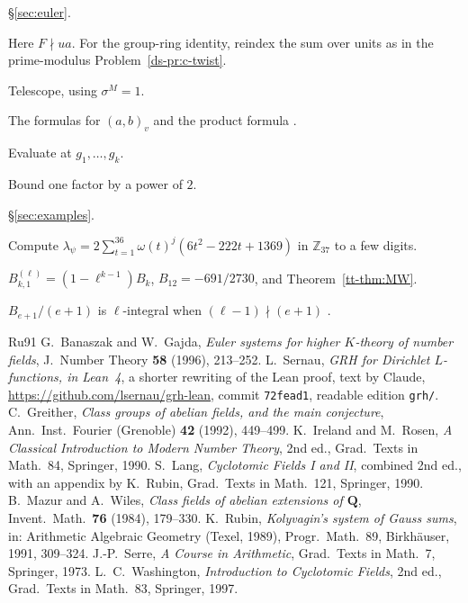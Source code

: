 \documentclass[reqno]{amsart}
\theoremstyle{definition}
\theoremstyle{plain}
\newcommand{\Z}{\mathbb{Z}}
\begin{document}
{\noindent\S\ref{sec:euler}.
\begin{description}\setlength{\itemsep}{0pt}
\item[\ref{pr:theta}] Here \(F\nmid ua\).  For the group-ring identity, reindex the sum over units as in the prime-modulus Problem~\ref{ds-pr:c-twist}.
\item[\ref{pr:derivative}] Telescope, using \(\sigma^M=1\).
\item[\ref{pr:hilbert}] The formulas for \((a,b)_v\) and the product formula \cite[Ch.~III, \S2]{Se}.
\item[\ref{pr:exponent-rank}] Evaluate at \(g_1,\dots,g_k\).
\item[\ref{pr:sum-e}] Bound one factor by a power of \(2\).
\end{description}

\noindent\S\ref{sec:examples}.
\begin{description}\setlength{\itemsep}{0pt}
\item[\ref{pr:37}] Compute \(\lambda_\psi=2\sum_{t=1}^{36}\omega(t)^j(6t^2-222t+1369)\) in \(\Z_{37}\) to a few digits.
\item[\ref{pr:psi-one}] \(B^{(\ell)}_{k,1}=(1-\ell^{k-1})B_k\), \(B_{12}=-691/2730\), and Theorem~\ref{tt-thm:MW}.
\item[\ref{pr:compare}] \(B_{e+1}/(e+1)\) is \(\ell\)-integral when \((\ell-1)\nmid(e+1)\) \cite[Cor.~5.14]{Wa}.
\end{description}

}

{\small
\begin{thebibliography}{Ru91}
 G.~Banaszak and W.~Gajda, \emph{Euler systems for higher \(K\)-theory of number fields}, J.\ Number Theory \textbf{58} (1996), 213--252.
 L.~Sernau, \emph{GRH for Dirichlet \(L\)-functions, in Lean~4}, a shorter rewriting of the Lean proof, text by Claude, \url{https://github.com/lsernau/grh-lean}, commit \texttt{72fead1}, readable edition \texttt{grh/}.
 C.~Greither, \emph{Class groups of abelian fields, and the main conjecture}, Ann.\ Inst.\ Fourier (Grenoble) \textbf{42} (1992), 449--499.
 K.~Ireland and M.~Rosen, \emph{A Classical Introduction to Modern Number Theory}, 2nd ed., Grad.\ Texts in Math.\ 84, Springer, 1990.
 S.~Lang, \emph{Cyclotomic Fields I and II}, combined 2nd ed., with an appendix by K.~Rubin, Grad.\ Texts in Math.\ 121, Springer, 1990.
 B.~Mazur and A.~Wiles, \emph{Class fields of abelian extensions of \(\mathbf{Q}\)}, Invent.\ Math.\ \textbf{76} (1984), 179--330.
 K.~Rubin, \emph{Kolyvagin's system of Gauss sums}, in: Arithmetic Algebraic Geometry (Texel, 1989), Progr.\ Math.\ 89, Birkh\"auser, 1991, 309--324.
 J.-P.~Serre, \emph{A Course in Arithmetic}, Grad.\ Texts in Math.\ 7, Springer, 1973.
 L.~C.~Washington, \emph{Introduction to Cyclotomic Fields}, 2nd ed., Grad.\ Texts in Math.\ 83, Springer, 1997.
\end{thebibliography}
}
\end{document}
